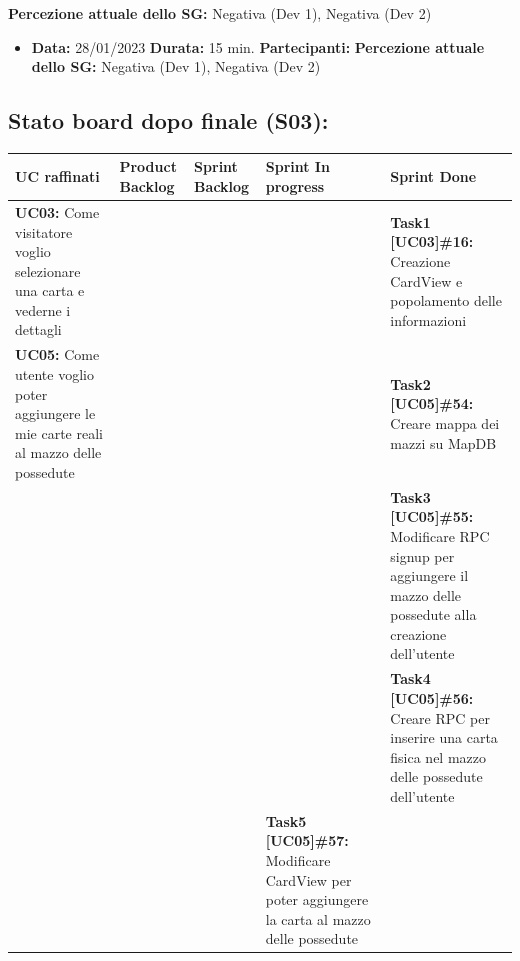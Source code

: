 \begin{landscape}
\begin{itemize}
            \newline \textbf{Percezione attuale dello SG:} Negativa (Dev 1), Negativa (Dev 2)
        \end{itemize}
        \begin{itemize}
            \item \textbf{Data:} 28/01/2023
            \newline \textbf{Durata:} 15 min.
            \newline \textbf{Partecipanti:} \tre
            \newline \textbf{Percezione attuale dello SG:} Negativa (Dev 1), Negativa (Dev 2)
        \end{itemize}

        \newpage
        \subsection{Stato board dopo finale (S03):}
        \begin{itemize}
            \small
            \def\arraystretch{2}%
            \begin{tabular}{ | p{5cm} | p{3cm} | p{5cm} | p{5cm} | p{5cm}| }
                \hline
                \textbf{UC raffinati}
                & \textbf{Product Backlog}
                & \textbf{Sprint Backlog}
                & \textbf{Sprint In progress}
                & \textbf{Sprint Done} \\
                \hline
                \hline
                \textbf{UC03:} Come visitatore voglio selezionare una carta e vederne i dettagli & & & &
                \textbf{Task1 [UC03]\#16:} Creazione CardView e popolamento delle informazioni \\
                \hline
                \textbf{UC05:} Come utente voglio poter aggiungere le mie carte reali al mazzo delle possedute
                & & & & \textbf{Task2 [UC05]\#54:} Creare mappa dei mazzi su MapDB \\
                \hline
                & & & & \textbf{Task3 [UC05]\#55:} Modificare RPC signup per aggiungere il mazzo delle possedute alla creazione dell'utente \\
                \hline
                & & & & \textbf{Task4 [UC05]\#56:} Creare RPC per inserire una carta fisica nel mazzo delle possedute dell'utente \\
                \hline
                & & & \textbf{Task5 [UC05]\#57:} Modificare CardView per poter aggiungere la carta al mazzo delle possedute & \\

\end{tabular}
\end{itemize}
\end{landscape}
